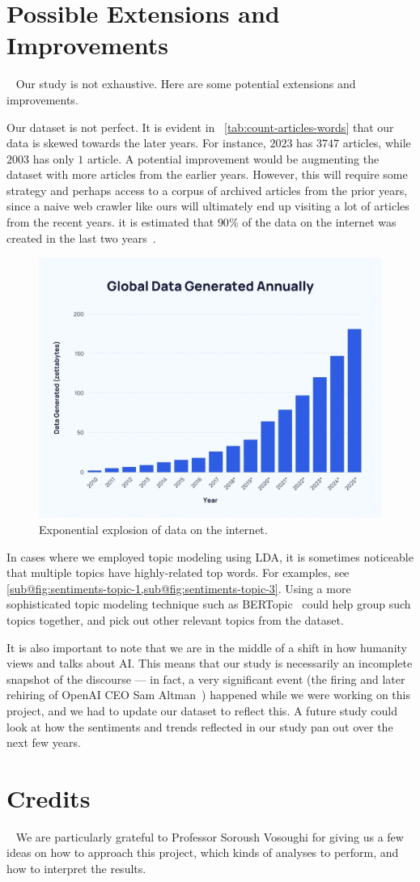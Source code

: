 \newpage
\section{Possible Extensions and Improvements}~\label{sec:conclusion}
Our study is not exhaustive. Here are some potential extensions and improvements.
\begin{enumarabic}
  \item Our dataset is not perfect. It is evident in
    ~\cref{tab:count-articles-words} that our data is skewed towards the later years.
    For instance, $2023$ has $3747$ articles, while $2003$ has only $1$ article.
    A potential improvement would be augmenting the dataset with more articles from the earlier years.
    However, this will require some strategy and perhaps access to a corpus of archived articles
    from the prior years, since a naive web crawler like ours will ultimately
    end up visiting a lot of articles from the recent years.
    it is estimated that $90\%$ of the data on the internet was created
    in the last two years~\cite{data-explosion}.

    \begin{figure}[H]
      \centering
      \includegraphics[width=.7\textwidth]{figures/data-explosion.png}
      \caption{Exponential explosion of data on the internet.~\cite{data-explosion}}
    \end{figure}

  \item In cases where we employed topic modeling using LDA,
    it is sometimes noticeable that multiple topics have highly-related top words.
    For examples, see \cref{sub@fig:sentiments-topic-1,sub@fig:sentiments-topic-3}.
    Using a more sophisticated topic modeling technique such as BERTopic~\cite{BERTopic}
    could help group such topics together, and pick out other relevant topics
    from the dataset.
  \item It is also important to note that we are in the middle of a shift
    in how humanity views and talks about AI.
    This means that our study is necessarily an incomplete snapshot of the discourse
    --- in fact, a very significant event (the firing and later rehiring of OpenAI CEO
    Sam Altman~\cite{openai-ceo-event}) happened while we were working on this project,
    and we had to update our dataset to reflect this.
    A future study could look at how the sentiments and trends reflected in our study
    pan out over the next few years.
\end{enumarabic}

\section{Credits}~\label{sec:credits}
We are particularly grateful to Professor Soroush Vosoughi for giving us
a few ideas on how to approach this project,
which kinds of analyses to perform, and how to interpret the results.
